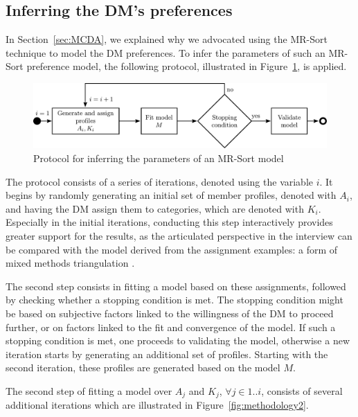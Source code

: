 \subsection{Inferring the DM's preferences}

In Section~\ref{sec:MCDA}, we explained why we advocated using the MR-Sort technique to model the DM preferences. To infer the parameters of such an MR-Sort preference model, the following protocol, illustrated in Figure~\ref{fig:methodology1}, is applied. 

\begin{figure}
\centering
\includegraphics[scale = 0.7]{fig/expdesign1}
\caption{Protocol for inferring the parameters of an MR-Sort model}\label{fig:methodology1}
\end{figure}

The protocol consists of a series of iterations, denoted using the variable $i$.  It begins by randomly generating an initial set of member profiles, denoted with $A_i$, and having the DM assign them to categories, which are denoted with $K_i$. Especially in the initial iterations, conducting this step
interactively provides greater support for the results, as the
articulated perspective in the interview can be compared with the
model derived from the assignment examples:
a form of mixed methods triangulation \citep{Myers97}. 

The second step consists in fitting a model based on these assignments, followed by checking whether a stopping condition is met. 
The stopping condition might be based on subjective factors linked to the willingness of the DM to proceed further, or on factors linked to the fit and convergence of the model. 
If such a stopping condition is met, one proceeds to validating the model, otherwise a new iteration starts by generating an additional set of profiles. Starting with the second iteration, these profiles are generated based on the model $M$.

The second step of fitting a model over $A_j$ and $K_j$, $\forall j \in 1..i$, consists of several additional iterations which are illustrated in Figure~\ref{fig:methodology2}.


